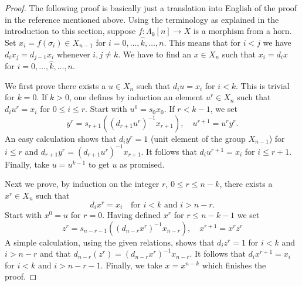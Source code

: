 \documentclass{stacks-project}
\theoremstyle{plain}
\theoremstyle{definition}
\theoremstyle{remark}
\numberwithin{equation}{subsection}
\begin{document}
\begin{proof}
The following proof is basically just a translation into English
of the proof in the reference mentioned above.
Using the terminology as explained in the introduction to this section,
suppose $f : \Lambda_k[n] \to X$ is a morphism from a horn. Set
$x_i = f(\sigma_i) \in X_{n - 1}$ for $i = 0, \ldots, \hat k, \ldots, n$.
This means that for $i < j$ we have $d_i x_j = d_{j - 1} x_i$
whenever $i, j \not = k$.
We have to find an $x \in X_n$ such that $x_i = d_ix$ for
$i = 0, \ldots, \hat k, \ldots, n$.

\medskip\noindent
We first prove there exists a $u \in X_n$ such that $d_i u = x_i$
for $i < k$. This is trivial for $k = 0$. If $k > 0$, one defines by
induction an element $u^r \in X_n$ such that $d_i u^r = x_i$ for
$0 \leq i \leq r$. Start with $u^0 = s_0x_0$. If $r < k - 1$,
we set
$$
y^r = s_{r + 1}((d_{r + 1}u^r)^{-1}x_{r + 1}),\quad
u^{r + 1} = u^r y^r.
$$
An easy calculation shows that $d_iy^r = 1$ (unit element of the group
$X_{n - 1}$) for $i \leq r$ and
$d_{r + 1}y^r = (d_{r + 1}u^r)^{-1}x_{r + 1}$. It follows that
$d_iu^{r + 1} = x_i$ for $i \leq r + 1$. Finally, take $u = u^{k - 1}$
to get $u$ as promised.

\medskip\noindent
Next we prove, by induction on the integer $r$, $0 \leq r \leq n - k$,
there exists a $x^r \in X_n$ such that
$$
d_i x^r = x_i\quad\text{for }i < k\text{ and }i > n - r.
$$
Start with $x^0 = u$ for $r = 0$. Having defined $x^r$ for $r \leq n - k - 1$
we set
$$
z^r = s_{n - r - 1}((d_{n - r}x^r)^{-1}x_{n - r}),\quad x^{r + 1} = x^rz^r
$$
A simple calculation, using the given relations, shows that
$d_iz^r = 1$ for $i < k$ and $i > n - r$ and that
$d_{n - r}(z^r) = (d_{n - r}x^r)^{-1}x_{n - r}$. It follows that
$d_ix^{r + 1} = x_i$ for $i < k$ and $i > n - r - 1$. Finally, we
take $x = x^{n - k}$ which finishes the proof.
\end{proof}
\end{document}
